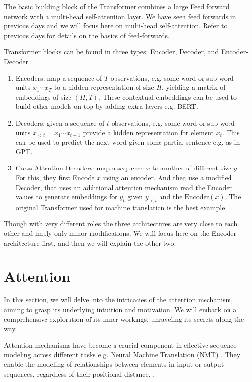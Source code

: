 The basic building block of the Transformer combines a large Feed forward network with a multi-head self-attention layer. We have seen feed forwards in previous days and we will focus here on multi-head self-attention. Refer to previous days for details on the basics of feed-forwards.

Transformer blocks can be found in three types: Encoder, Decoder, and Encoder-Decoder 

\begin{enumerate}
\item Encoders: map a sequence of $T$ observations, e.g. some word or sub-word units $x_1 \cdots x_T$ to a hidden representation of size $H$, yielding a matrix of embeddings of size $(H, T)$. These contextual embeddings can be used to build other models on top by adding extra layers e.g. BERT.
\item Decoders: given a sequence of $t$ observations, e.g. some word or sub-word units $x_{<t} = x_1 \cdots x_{t-1}$ provide a hidden representation for element $x_t$. This can be used to predict the next word given some partial sentence e.g. as in GPT. 
\item Cross-Attention-Decoders: map a sequence $x$ to another of different size $y$. For this, they first Encode $x$ using an encoder. And then use a modified Decoder, that uses an additional attention mechanism read the Encoder values to generate embeddings for $y_t$ given $y_{<t}$ and the $\mathrm{Encoder}(x)$. The original Transformer used for machine translation is the best example.
\end{enumerate}

Though with very different roles the three architectures are very close to each other and imply only minor modifications. We will focus here on the Encoder architecture first, and then we will explain the other two.

\section{Attention}
In this section, we will delve into the intricacies of the attention mechanism, aiming to grasp its underlying intuition and motivation. We will embark on a comprehensive exploration of its inner workings, unraveling its secrets along the way.

Attention mechanisms have become a crucial component in effective sequence modeling across different tasks e.g. Neural Machine Translation (NMT) \cite{vaswani2017attention}. They enable the modeling of relationships between elements in input or output sequences, regardless of their positional distance. \cite{bahdanau2014neural, kim2017structured}.

